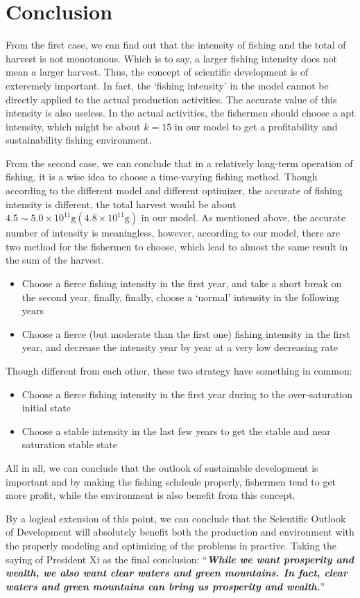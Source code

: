 \documentclass{IEEEtran}
\begin{document}
\section{Conclusion}

From the first case, we can find out that the intensity of fishing and the total of harvest is not monotonous. Which is to say, a larger fishing intensity does not mean a larger harvest. Thus, the concept of scientific development is of exteremely important. In fact, the `fishing intensity'  in the model cannot be directly applied to the actual production activities. The accurate value of this intensity is also useless. In the actual activities, the fishermen should choose a apt intensity, which might be about $k = 15$ in our model to get a profitability and sustainability fishing environment.

From the second case, we can conclude that in a relatively long-term operation of fishing, it is a wise idea to choose a time-varying fishing method. Though according to the different model and different optimizer, the accurate of fishing intensity is different, the total harvest would be about $4.5\sim 5.0 \times 10^{11}\mathrm g (4.8 \times 10^{11} \mathrm g)$ in our model. As mentioned above, the accurate number of intensity is meaningless, however, according to our model, there are two method for the fishermen to choose, which lead to almost the same result in the sum of the harvest.

\begin{itemize}
    \item {Choose a fierce fishing intensity in the first year, and take a short break on the second year, finally, finally, choose a `normal' intensity in the following years}
    \item {Choose a fierce (but moderate than the first one) fishing intensity in the first year, and decrease the intensity year by year at a very low decreasing rate}
\end{itemize}

Though different from each other, these two strategy have something in common:

\begin{itemize}
    \item {Choose a fierce fishing intensity in the first year during to the over-saturation initial state}
    \item {Choose a stable intensity in the last few years to get the stable and near saturation stable state}
\end{itemize}

All in all, we can conclude that the outlook of sustainable development is important and by making the fishing schdeule properly, fishermen tend to get more profit, while the environment is also benefit from this concept.

By a logical extension of this point, we can conclude that the Scientific Outlook of Development will absolutely benefit both the production and environment with the properly modeling and optimizing of the problems in practive. Taking the saying of President Xi as the final conclusion: ``\textbf{\textit{While we want prosperity and wealth, we also want clear waters and green mountains. In fact, clear waters and green mountains can bring us prosperity and wealth.}}''
\end{document}
